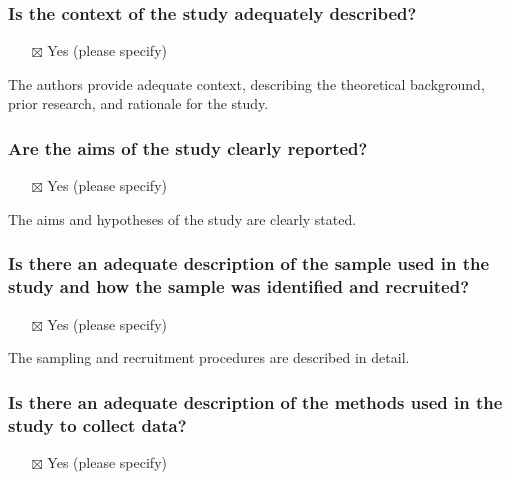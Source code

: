 \documentclass[
  doc, a4paper]{apa7}
\providecommand{\tightlist}{%
  \setlength{\itemsep}{0pt}\setlength{\parskip}{0pt}}
\begin{document}
\subsubsection{Is the context of the study adequately described?}\label{is-the-context-of-the-study-adequately-described}

\begin{itemize}
\tightlist
\item[$\boxtimes$]
  Yes (please specify)
\end{itemize}

The authors provide adequate context, describing the theoretical background, prior research, and rationale for the study.

\subsubsection{Are the aims of the study clearly reported?}\label{are-the-aims-of-the-study-clearly-reported}

\begin{itemize}
\tightlist
\item[$\boxtimes$]
  Yes (please specify)
\end{itemize}

The aims and hypotheses of the study are clearly stated.

\subsubsection{Is there an adequate description of the sample used in the study and how the sample was identified and recruited?}\label{is-there-an-adequate-description-of-the-sample-used-in-the-study-and-how-the-sample-was-identified-and-recruited}

\begin{itemize}
\tightlist
\item[$\boxtimes$]
  Yes (please specify)
\end{itemize}

The sampling and recruitment procedures are described in detail.

\subsubsection{Is there an adequate description of the methods used in the study to collect data?}\label{is-there-an-adequate-description-of-the-methods-used-in-the-study-to-collect-data}

\begin{itemize}
\tightlist
\item[$\boxtimes$]
  Yes (please specify)
\end{itemize}
\end{document}
